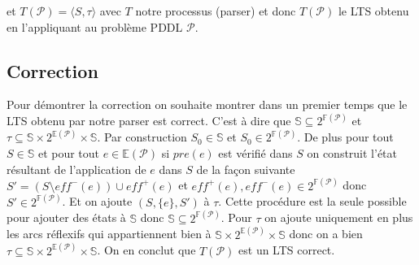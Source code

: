 et $T(\mathcal{P}) = \langle S, \tau \rangle $ avec $T$ notre processus (parser) et donc $T(\mathcal{P})$ le LTS obtenu en l'appliquant au problème PDDL $\mathcal{P}$.


\subsection{Correction}
Pour démontrer la correction on souhaite montrer dans un premier temps que le LTS obtenu par notre parser est correct. C'est à dire que $\mathds{S} \subseteq 2 ^{\mathds{F}(\mathcal{P})}$ et $\tau \subseteq \mathds{S} \times 2 ^{\mathds{E}(\mathcal{P})} \times \mathds{S} $. Par construction $S_0 \in \mathds{S}$ et $S_0\in 2 ^{\mathds{F}(\mathcal{P})}$. De plus pour tout $S\in \mathds{S}$ et pour tout $e \in \mathds{E}(\mathcal{P})$ si $pre(e)$ est vérifié dans $S$ on construit l'état résultant de l'application de $e$ dans $S$ de la façon suivante $S' = (S \setminus eff^-(e)) \cup eff^+(e)$ et $eff^+(e),eff^-(e) \in 2 ^{\mathds{F}(\mathcal{P})}$ donc $S'\in 2 ^{\mathds{F}(\mathcal{P})}$. Et on ajoute $(S,\{e\}, S')$ à $\tau$. Cette procédure est la seule possible pour ajouter des états à $\mathds{S}$ donc $\mathds{S} \subseteq 2 ^{\mathds{F}(\mathcal{P})}$. 
Pour $\tau$ on ajoute uniquement en plus les arcs réflexifs qui appartiennent bien à $\mathds{S} \times 2 ^{\mathds{E}(\mathcal{P})} \times \mathds{S}$ donc on a bien $\tau \subseteq \mathds{S} \times 2 ^{\mathds{E}(\mathcal{P})} \times \mathds{S} $. On en conclut que $T(\mathcal{P})$ est un LTS correct.

